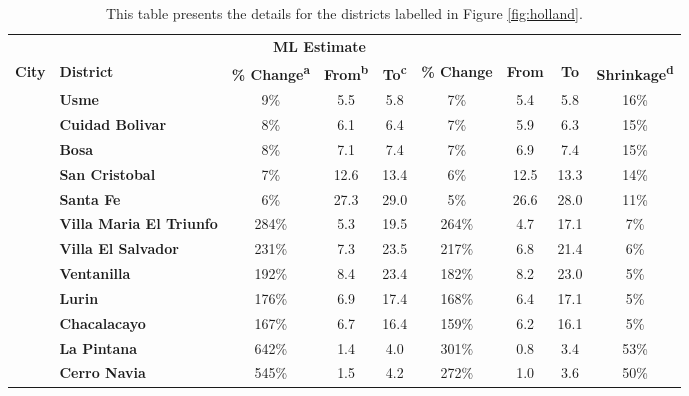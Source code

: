\begin{table}[!h]

\caption{\label{tab:}\label{tab:top-5}This table presents the details for the districts labelled in Figure \ref{fig:holland}.}
\centering
\fontsize{8}{10}\selectfont
\begin{tabular}[t]{>{\bfseries}l>{\bfseries}lccccccc}
\toprule
\multicolumn{2}{c}{\textbf{ }} & \multicolumn{3}{c}{\textbf{Average of Simulations}} & \multicolumn{3}{c}{\textbf{ML Estimate}} & \multicolumn{1}{c}{\textbf{ }} \\
\cmidrule(l{3pt}r{3pt}){3-5} \cmidrule(l{3pt}r{3pt}){6-8}
\textbf{City} & \textbf{District} & \textbf{\% Change\textsuperscript{a}} & \textbf{From\textsuperscript{b}} & \textbf{To\textsuperscript{c}} & \textbf{\% Change} & \textbf{From} & \textbf{To} & \textbf{Shrinkage\textsuperscript{d}}\\
\midrule
 & Usme & 9\% & 5.5 & 5.8 & 7\% & 5.4 & 5.8 & 16\%\\

 & Cuidad Bolivar & 8\% & 6.1 & 6.4 & 7\% & 5.9 & 6.3 & 15\%\\

 & Bosa & 8\% & 7.1 & 7.4 & 7\% & 6.9 & 7.4 & 15\%\\

 & San Cristobal & 7\% & 12.6 & 13.4 & 6\% & 12.5 & 13.3 & 14\%\\

\multirow{-5}{*}{\raggedright\arraybackslash Bogota} & Santa Fe & 6\% & 27.3 & 29.0 & 5\% & 26.6 & 28.0 & 11\%\\
\cmidrule{1-9}
 & Villa Maria El Triunfo & 284\% & 5.3 & 19.5 & 264\% & 4.7 & 17.1 & 7\%\\

 & Villa El Salvador & 231\% & 7.3 & 23.5 & 217\% & 6.8 & 21.4 & 6\%\\

 & Ventanilla & 192\% & 8.4 & 23.4 & 182\% & 8.2 & 23.0 & 5\%\\

 & Lurin & 176\% & 6.9 & 17.4 & 168\% & 6.4 & 17.1 & 5\%\\

\multirow{-5}{*}{\raggedright\arraybackslash Lima} & Chacalacayo & 167\% & 6.7 & 16.4 & 159\% & 6.2 & 16.1 & 5\%\\
\cmidrule{1-9}
 & La Pintana & 642\% & 1.4 & 4.0 & 301\% & 0.8 & 3.4 & 53\%\\

 & Cerro Navia & 545\% & 1.5 & 4.2 & 272\% & 1.0 & 3.6 & 50\%\\


\end{tabular}
\end{table}
